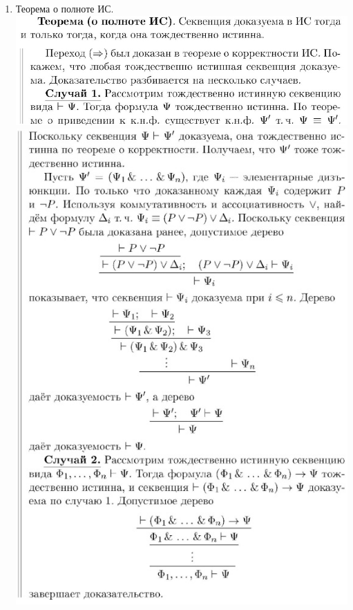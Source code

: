 \documentclass[a4paper]{article}
\theoremstyle{definition}
\begin{document}
\begin{enumerate}
 \item Теорема о полноте ИС.
       \mbox{}\\ \includegraphics[scale=0.6]{38_1.jpg}\\
       \includegraphics[scale=0.89]{38_2.jpg}\\

\end{enumerate}
\end{document}
